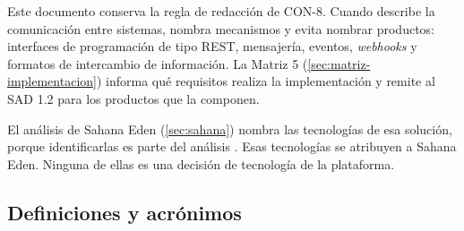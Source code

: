 \documentclass[11pt,letterpaper]{article}
\begin{document}
Este documento conserva la regla de redacción de CON-8. Cuando describe la comunicación entre
sistemas, nombra mecanismos y evita nombrar productos: interfaces de programación de tipo REST,
mensajería, eventos, \emph{webhooks} y formatos de intercambio de información. La Matriz 5
(\cref{sec:matriz-implementacion}) informa qué requisitos realiza la implementación y remite al
SAD 1.2 para los productos que la componen.

El análisis de Sahana Eden (\cref{sec:sahana}) nombra las tecnologías de esa solución, porque
identificarlas es parte del análisis \cite{enunciado}. Esas tecnologías se atribuyen a Sahana Eden.
Ninguna de ellas es una decisión de tecnología de la plataforma.

\subsection{Definiciones y acrónimos}
\end{document}
